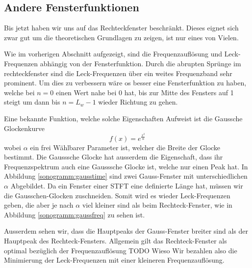 \subsection{Andere Fensterfunktionen}
Bis jetzt haben wir uns auf das Rechteckfenster beschränkt.
Dieses eignet sich zwar gut um die theoretischen Grundlagen zu zeigen,
ist nur eines von Vielen.

Wie im vorherigen Abschnitt aufgezeigt, sind die Frequenzauflösung und 
Leck-Frequenzen abhängig von der Fensterfunktion.
Durch die abrupten Sprünge im rechteckfenster sind die Leck-Frequenzen 
über ein weites Frequenzband sehr prominent.
Um dies zu verbessern wäre os besser eine Fensterfunktion zu haben,
welche bei $n = 0$ einen Wert nahe bei 0 hat,
bis zur Mitte des Fensters auf 1 steigt um dann bis $n = L_w -1$ wieder Richtung zu gehen. 

Eine bekannte Funktion, welche solche Eigenschaften Aufweist ist die Gaussche Glockenkurve
\begin{equation}
    f(x) = e^{\frac{x^2}{\alpha}}
\end{equation}
wobei $\alpha$ ein frei Wählbarer Parameter ist, welcher die Breite der Glocke 
bestimmt.
Die Gausssche Glocke hat ausserdem die Eigenschaft, dass ihr Frequenzspektrum 
auch eine Gausssche Glocke ist, welche nur einen Peak hat.
In Abbildung \ref{sonogramm:gausstime} sind zwei Gauss-Fenster mit unterschiedlichen 
$\alpha$ Abgebildet.
Da ein Fenster einer STFT eine definierte Länge hat, müssen wir die Gausschen-Glocken 
zuschneiden. 
Somit wird es wieder Leck-Frequenzen geben, die aber je nach $\alpha$ viel kleiner sind
als beim Rechteck-Fenster, wie in Abbildung \ref{sonogramm:gaussfreq} zu sehen ist.

Ausserdem sehen wir, dass die Hauptpeaks der Gauss-Fenster breiter sind als der 
Hauptpeak des Rechteck-Fensters.
Allgemein gilt das Rechteck-Fenster als optimal bezüglich der Frequenzauflösung
TODO Wieso
Wir bezahlen also die Minimierung der Leck-Frequenzen mit einer kleineren Frequenzauflösung. 

